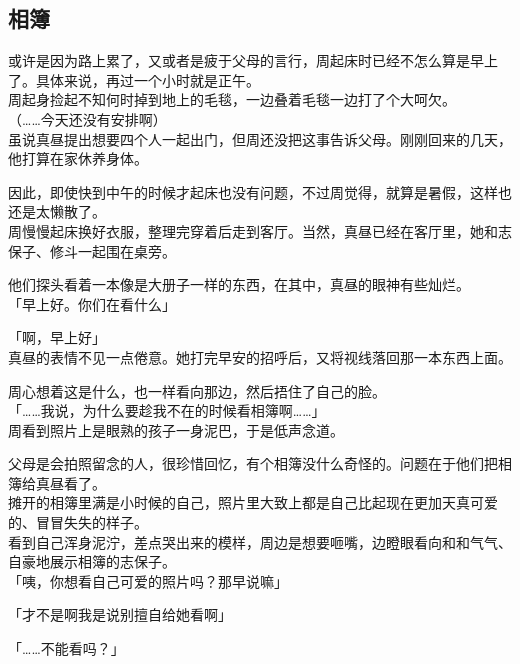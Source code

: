 \subsection{相簿}

或许是因为路上累了，又或者是疲于父母的言行，周起床时已经不怎么算是早上了。具体来说，再过一个小时就是正午。\\

周起身捡起不知何时掉到地上的毛毯，一边叠着毛毯一边打了个大呵欠。\\

（……今天还没有安排啊）\\

虽说真昼提出想要四个人一起出门，但周还没把这事告诉父母。刚刚回来的几天，他打算在家休养身体。

因此，即使快到中午的时候才起床也没有问题，不过周觉得，就算是暑假，这样也还是太懒散了。\\

周慢慢起床换好衣服，整理完穿着后走到客厅。当然，真昼已经在客厅里，她和志保子、修斗一起围在桌旁。

他们探头看着一本像是大册子一样的东西，在其中，真昼的眼神有些灿烂。\\

「早上好。你们在看什么」

「啊，早上好」\\

真昼的表情不见一点倦意。她打完早安的招呼后，又将视线落回那一本东西上面。

周心想着这是什么，也一样看向那边，然后捂住了自己的脸。\\

「……我说，为什么要趁我不在的时候看相簿啊……」\\

周看到照片上是眼熟的孩子一身泥巴，于是低声念道。

父母是会拍照留念的人，很珍惜回忆，有个相簿没什么奇怪的。问题在于他们把相簿给真昼看了。\\

摊开的相簿里满是小时候的自己，照片里大致上都是自己比起现在更加天真可爱的、冒冒失失的样子。\\

看到自己浑身泥泞，差点哭出来的模样，周边是想要咂嘴，边瞪眼看向和和气气、自豪地展示相簿的志保子。\\

「咦，你想看自己可爱的照片吗？那早说嘛」

「才不是啊我是说别擅自给她看啊」

「……不能看吗？」

